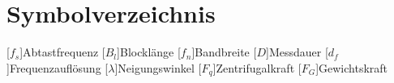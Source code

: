 \chapter*{Symbolverzeichnis}
\begin{acronym}[BreiteDerLinkenSpalte]

[$f_s$]{Abtastfrequenz}
[$B_l$]{Blocklänge}
[$f_n$]{Bandbreite}
[$D$]{Messdauer}
[$d_f$]{Frequenzauflösung}
[$\lambda$]{Neigungswinkel}
[$F_q$]{Zentrifugalkraft}
[$F_G$]{Gewichtskraft}
\end{acronym}